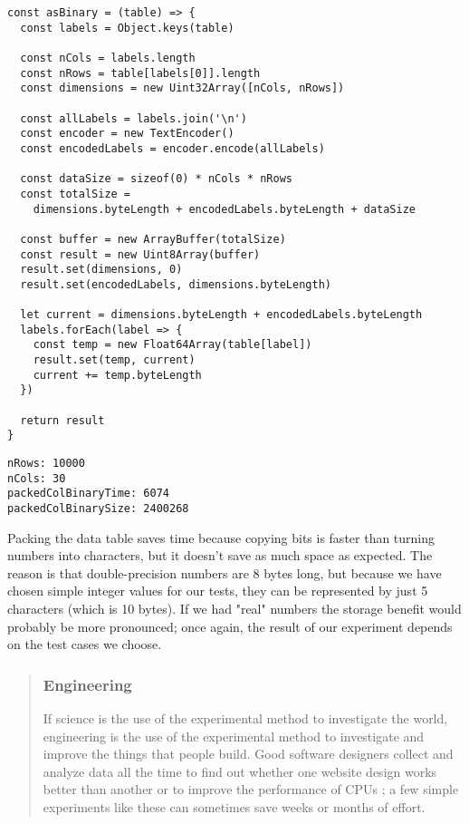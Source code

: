 \documentclass[krantzl]{krantz}
\newenvironment{callout}{\savenotes\begin{tBox}\begin{quotation}\toggletrue{inbox}\renewcommand{\thempfootnote}{\arabic{footnote}}}{\end{quotation}\vspace{\baselineskip}\end{tBox}\togglefalse{inbox}\spewnotes}
\begin{document}
\begin{lstlisting}[frame=single,frameround=tttt]
const asBinary = (table) => {
  const labels = Object.keys(table)

  const nCols = labels.length
  const nRows = table[labels[0]].length
  const dimensions = new Uint32Array([nCols, nRows])

  const allLabels = labels.join('\n')
  const encoder = new TextEncoder()
  const encodedLabels = encoder.encode(allLabels)

  const dataSize = sizeof(0) * nCols * nRows
  const totalSize =
    dimensions.byteLength + encodedLabels.byteLength + dataSize

  const buffer = new ArrayBuffer(totalSize)
  const result = new Uint8Array(buffer)
  result.set(dimensions, 0)
  result.set(encodedLabels, dimensions.byteLength)

  let current = dimensions.byteLength + encodedLabels.byteLength
  labels.forEach(label => {
    const temp = new Float64Array(table[label])
    result.set(temp, current)
    current += temp.byteLength
  })

  return result
}
\end{lstlisting}



\begin{lstlisting}[frame=single,frameround=tttt]
nRows: 10000
nCols: 30
packedColBinaryTime: 6074
packedColBinarySize: 2400268
\end{lstlisting}



Packing the data table saves time
because copying bits is faster than turning numbers into characters,
but it doesn't save as much space as expected.
The reason is that double-precision numbers are 8 bytes long,
but because we have chosen simple integer values for our tests,
they can be represented by just 5 characters (which is 10 bytes).
If we had "real" numbers the storage benefit would probably be more pronounced;
once again,
the result of our experiment depends on the test cases we choose.

\begin{callout}


\subsubsection*{Engineering}


If science is the use of the experimental method to investigate the world,
engineering is the use of the experimental method
to investigate and improve the things that people build.
Good software designers collect and analyze data all the time
to find out whether one website design works better than another \cite{Kohavi2020}
or to improve the performance of CPUs \cite{Patterson2017};
a few simple experiments like these can sometimes save weeks or months of effort.

\end{callout}
\end{document}
